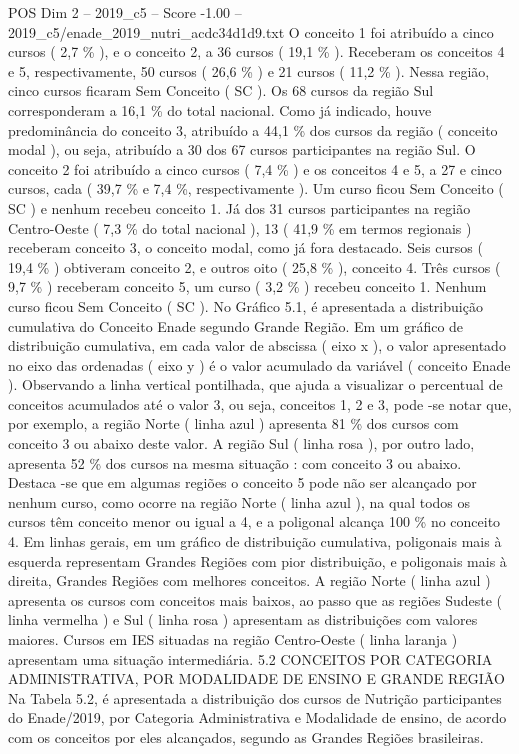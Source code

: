 \begin{textsample}{POS Dim 2 – 2019\_c5 – Score -1.00 – 2019\_c5/enade\_2019\_nutri\_acdc34d1d9.txt}
O conceito 1 foi atribuído a cinco cursos ( 2,7 \% ), e o conceito 2, a 36 cursos ( 19,1 \% ).
Receberam os conceitos 4 e 5, respectivamente, 50 cursos ( 26,6 \% ) e 21 cursos ( 11,2 \% ).
Nessa região, cinco cursos ficaram Sem Conceito ( SC ).
Os 68 cursos da região Sul corresponderam a 16,1 \% do total nacional.
Como já indicado, houve predominância do conceito 3, atribuído a 44,1 \% dos cursos da região ( conceito modal ), ou seja, atribuído a 30 dos 67 cursos participantes na região Sul.
O conceito 2 foi atribuído a cinco cursos ( 7,4 \% ) e os conceitos 4 e 5, a 27 e cinco cursos, cada ( 39,7 \% e 7,4 \%, respectivamente ).
Um curso ficou Sem Conceito ( SC ) e nenhum recebeu conceito 1.
Já dos 31 cursos participantes na região Centro-Oeste ( 7,3 \% do total nacional ), 13 ( 41,9 \% em termos regionais ) receberam conceito 3, o conceito modal, como já fora destacado.
Seis cursos ( 19,4 \% ) obtiveram conceito 2, e outros oito ( 25,8 \% ), conceito 4.
Três cursos ( 9,7 \% ) receberam conceito 5, um curso ( 3,2 \% ) recebeu conceito 1.
Nenhum curso ficou Sem Conceito ( SC ).
No Gráfico 5.1, é apresentada a distribuição cumulativa do Conceito Enade segundo Grande Região.
Em um gráfico de distribuição cumulativa, em cada valor de abscissa ( eixo x ), o valor apresentado no eixo das ordenadas ( eixo y ) é o valor acumulado da variável ( conceito Enade ).
Observando a linha vertical pontilhada, que ajuda a visualizar o percentual de conceitos acumulados até o valor 3, ou seja, conceitos 1, 2 e 3, pode -se notar que, por exemplo, a região Norte ( linha azul ) apresenta 81 \% dos cursos com conceito 3 ou abaixo deste valor.
A região Sul ( linha rosa ), por outro lado, apresenta 52 \% dos cursos na mesma situação : com conceito 3 ou abaixo.
Destaca -se que em algumas regiões o conceito 5 pode não ser alcançado por nenhum curso, como ocorre na região Norte ( linha azul ), na qual todos os cursos têm conceito menor ou igual a 4, e a poligonal alcança 100 \% no conceito 4.
Em linhas gerais, em um gráfico de distribuição cumulativa, poligonais mais à esquerda representam Grandes Regiões com pior distribuição, e poligonais mais à direita, Grandes Regiões com melhores conceitos.
A região Norte ( linha azul ) apresenta os cursos com conceitos mais baixos, ao passo que as regiões Sudeste ( linha vermelha ) e Sul ( linha rosa ) apresentam as distribuições com valores maiores.
Cursos em IES situadas na região Centro-Oeste ( linha laranja ) apresentam uma situação intermediária. 5.2 CONCEITOS POR CATEGORIA ADMINISTRATIVA, POR MODALIDADE DE ENSINO E GRANDE REGIÃO Na Tabela 5.2, é apresentada a distribuição dos cursos de Nutrição participantes do Enade/2019, por Categoria Administrativa e Modalidade de ensino, de acordo com os conceitos por eles alcançados, segundo as Grandes Regiões brasileiras.

\end{textsample}
